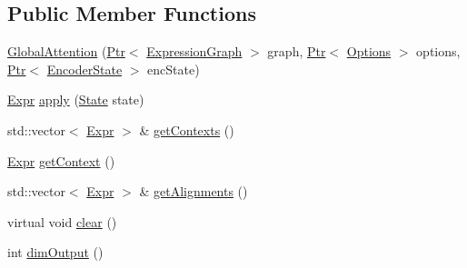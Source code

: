 \subsection*{Public Member Functions}
\begin{DoxyCompactItemize}
\item 
\hyperlink{classmarian_1_1rnn_1_1GlobalAttention_ab5e4f0df89d2569d44a28696de3ace0f}{Global\+Attention} (\hyperlink{namespacemarian_ad1a373be43a00ef9ce35666145137b08}{Ptr}$<$ \hyperlink{classmarian_1_1ExpressionGraph}{Expression\+Graph} $>$ graph, \hyperlink{namespacemarian_ad1a373be43a00ef9ce35666145137b08}{Ptr}$<$ \hyperlink{classmarian_1_1Options}{Options} $>$ options, \hyperlink{namespacemarian_ad1a373be43a00ef9ce35666145137b08}{Ptr}$<$ \hyperlink{classmarian_1_1EncoderState}{Encoder\+State} $>$ enc\+State)
\item 
\hyperlink{namespacemarian_a498d8baf75b754011078b890b39c8e12}{Expr} \hyperlink{classmarian_1_1rnn_1_1GlobalAttention_a7f1781d0f0c94222a2b0343cb55915ca}{apply} (\hyperlink{structmarian_1_1rnn_1_1State}{State} state)
\item 
std\+::vector$<$ \hyperlink{namespacemarian_a498d8baf75b754011078b890b39c8e12}{Expr} $>$ \& \hyperlink{classmarian_1_1rnn_1_1GlobalAttention_abeae4a963a85ca1642c387d241cec5ad}{get\+Contexts} ()
\item 
\hyperlink{namespacemarian_a498d8baf75b754011078b890b39c8e12}{Expr} \hyperlink{classmarian_1_1rnn_1_1GlobalAttention_ad518e4c82f56b8f95393dffa2df2288b}{get\+Context} ()
\item 
std\+::vector$<$ \hyperlink{namespacemarian_a498d8baf75b754011078b890b39c8e12}{Expr} $>$ \& \hyperlink{classmarian_1_1rnn_1_1GlobalAttention_a7fab38ad7965922a7e8eb26f0d4906af}{get\+Alignments} ()
\item 
virtual void \hyperlink{classmarian_1_1rnn_1_1GlobalAttention_a3666babca6435bc45280836e58ef7ac2}{clear} ()
\item 
int \hyperlink{classmarian_1_1rnn_1_1GlobalAttention_ae7b20fd78fdd9e5f72eee775de24cf7b}{dim\+Output} ()
\end{DoxyCompactItemize}
